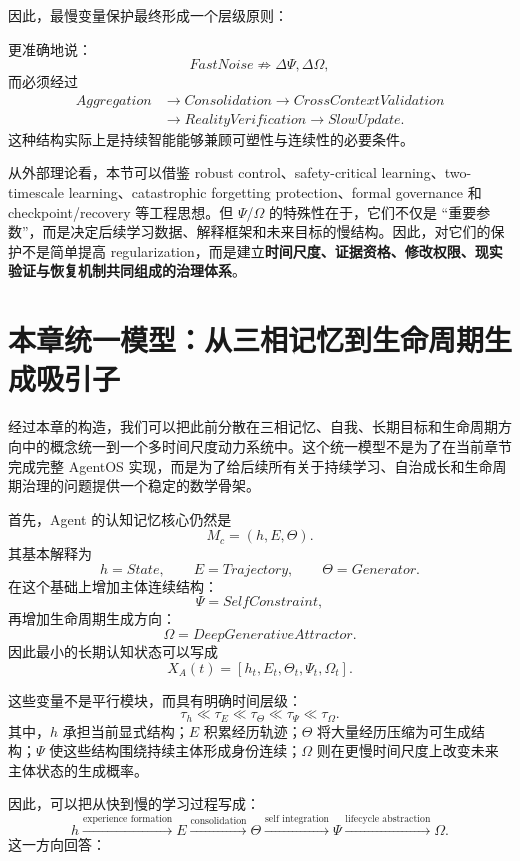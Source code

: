 因此，最慢变量保护最终形成一个层级原则：
\begin{statementbox}
\centering
{}
\end{statementbox}
更准确地说：
\[
FastNoise
\not\Rightarrow
\Delta\Psi,\Delta\Omega,
\]
而必须经过
\[
\begin{aligned}
Aggregation&\rightarrow Consolidation\rightarrow CrossContextValidation\\
&\rightarrow RealityVerification\rightarrow SlowUpdate.
\end{aligned}
\]
这种结构实际上是持续智能能够兼顾可塑性与连续性的必要条件。

从外部理论看，本节可以借鉴 robust control、safety-critical learning、two-timescale learning、catastrophic forgetting protection、formal governance 和 checkpoint/recovery 等工程思想。但 $\Psi$/$\Omega$ 的特殊性在于，它们不仅是 ``重要参数''，而是决定后续学习数据、解释框架和未来目标的慢结构。因此，对它们的保护不是简单提高 regularization，而是建立\textbf{时间尺度、证据资格、修改权限、现实验证与恢复机制共同组成的治理体系}。

\section{本章统一模型：从三相记忆到生命周期生成吸引子}

经过本章的构造，我们可以把此前分散在三相记忆、自我、长期目标和生命周期方向中的概念统一到一个多时间尺度动力系统中。这个统一模型不是为了在当前章节完成完整 AgentOS 实现，而是为了给后续所有关于持续学习、自治成长和生命周期治理的问题提供一个稳定的数学骨架。

首先，Agent 的认知记忆核心仍然是
\[
M_c
=
(h,E,\Theta).
\]
其基本解释为
\[
h=State,
\qquad
E=Trajectory,
\qquad
\Theta=Generator.
\]
在这个基础上增加主体连续结构：
\[
\Psi=SelfConstraint,
\]
再增加生命周期生成方向：
\[
\Omega=DeepGenerativeAttractor.
\]
因此最小的长期认知状态可以写成
\[
\boxed{
X_A(t)
=
[
h_t,E_t,\Theta_t,\Psi_t,\Omega_t
].
}
\]

这些变量不是平行模块，而具有明确时间层级：
\[
\boxed{
\tau_h
\ll
\tau_E
\ll
\tau_{\Theta}
\ll
\tau_{\Psi}
\ll
\tau_{\Omega}.
}
\]
其中，$h$ 承担当前显式结构；$E$ 积累经历轨迹；$\Theta$ 将大量经历压缩为可生成结构；$\Psi$ 使这些结构围绕持续主体形成身份连续；$\Omega$ 则在更慢时间尺度上改变未来主体状态的生成概率。

因此，可以把从快到慢的学习过程写成：
\[
h
\xrightarrow{\text{experience formation}}
E
\xrightarrow{\text{consolidation}}
\Theta
\xrightarrow{\text{self integration}}
\Psi
\xrightarrow{\text{lifecycle abstraction}}
\Omega.
\]
这一方向回答：
\begin{statementbox}
\centering
{}
\end{statementbox}

